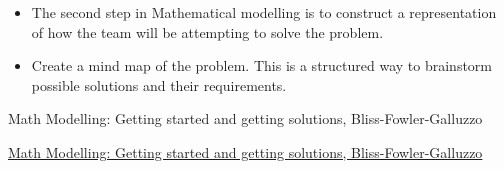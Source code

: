 \begin{lesson}

	\begin{itemize}
		\item The second step in Mathematical modelling is to construct a representation of how the team will be attempting to solve the problem.
		\item Create a mind map of the problem. This is a structured way to brainstorm possible solutions and their requirements.
	\end{itemize}
	

\begin{annotation}
	\begin{goals}
	Math Modelling: Getting started and getting solutions, Bliss-Fowler-Galluzzo
	
	\hfill {}	
	\end{goals}
\end{annotation}
	 \href{https://m3challenge.siam.org/resources/modeling-handbook}{Math Modelling: Getting started and getting solutions, Bliss-Fowler-Galluzzo}

\end{lesson}







\newpage

%





%
%
%
%
%	
%	
%
%
%
%
%
%
%


